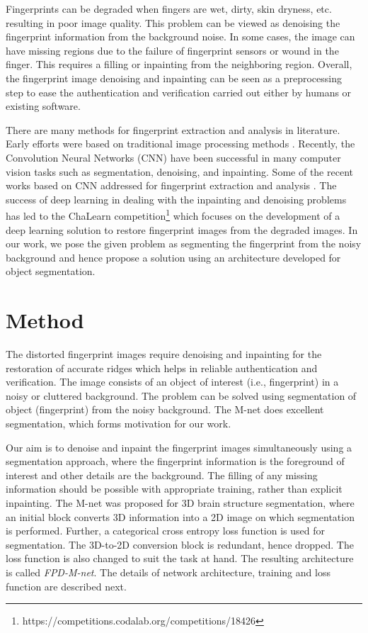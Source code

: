\documentclass{llncs}
\begin{document}
Fingerprints can be degraded when fingers are wet, dirty, skin dryness, etc. resulting in poor image quality. This problem can be viewed as denoising the fingerprint information from the background noise. In some cases, the image can have missing regions due to the failure of fingerprint sensors or wound in the finger. This requires a filling or inpainting from the neighboring region. Overall, the fingerprint image denoising and inpainting can be seen as a preprocessing step to ease the authentication and verification carried out either by humans or existing software.

There are many methods for fingerprint extraction and analysis in literature. Early efforts were based on traditional image processing methods \cite{hong1998fingerprint,greenberg2002fingerprint,wu2004fingerprint,rahmes2007fingerprint,khan2011fingerprint,singh2015fingerprint}. Recently, the Convolution Neural Networks (CNN) have been successful in many computer vision tasks such as segmentation, denoising, and inpainting. Some of the recent works based on CNN addressed for fingerprint extraction and analysis \cite{sahasrabudhe2014fingerprint,tang2017fingernet,nguyen2017robust,li2018deep}. The success of deep learning in dealing with the inpainting and denoising \cite{xie2012image} problems has led to the ChaLearn competition\footnote{https://competitions.codalab.org/competitions/18426} which focuses on the development of a deep learning solution to restore fingerprint images from the degraded images. In our work, we pose the given problem as segmenting the fingerprint from the noisy background and hence propose a solution using an architecture developed for object segmentation.

\section{Method}
\label{sec:method}
The distorted fingerprint images require denoising and inpainting for the restoration of accurate ridges which helps in reliable authentication and verification. The image consists of an object of interest (i.e., fingerprint) in a noisy or cluttered background. The problem can be solved using segmentation of object (fingerprint) from the noisy background. The M-net \cite{mehta2017m} does excellent segmentation, which forms motivation for our work.

Our aim is to denoise and inpaint the fingerprint images simultaneously using a segmentation approach, where the fingerprint information is the foreground of interest and other details are the background. The filling of any missing information should be possible with appropriate training, rather than explicit inpainting. The M-net was proposed for 3D brain structure segmentation, where an initial block converts 3D information into a 2D image on which segmentation is performed.  Further, a categorical cross entropy loss function is used for segmentation. The 3D-to-2D conversion block is redundant, hence dropped. The loss function is also changed to suit the task at hand. The resulting architecture is called \textit{FPD-M-net}. The details of network architecture, training and loss function are described next.
\end{document}
